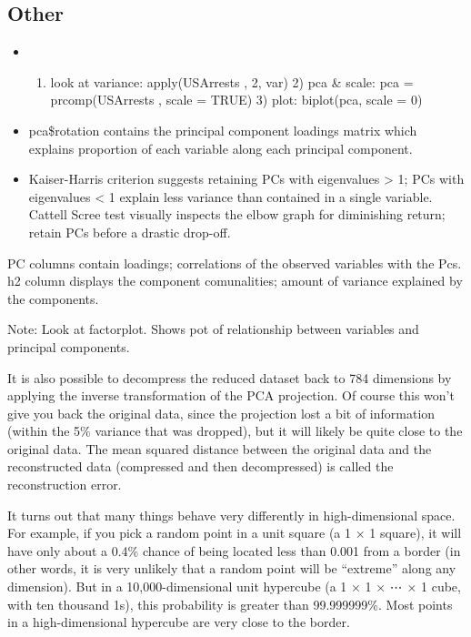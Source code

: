 \documentclass[]{book}
\providecommand{\tightlist}{%
  \setlength{\itemsep}{0pt}\setlength{\parskip}{0pt}}
\theoremstyle{definition}
\theoremstyle{definition}
\theoremstyle{definition}
\theoremstyle{remark}
\begin{document}
\subsection{Other}\label{other-2}

\begin{itemize}
\item
  \begin{enumerate}
  \def\labelenumi{\arabic{enumi})}
  \tightlist
  \item
    look at variance: apply(USArrests , 2, var) \textbar{} 2) pca \&
    scale: pca = prcomp(USArrests , scale = TRUE) \textbar{} 3) plot:
    biplot(pca, scale = 0)
  \end{enumerate}
\item
  pca\$rotation contains the principal component loadings matrix which
  explains proportion of each variable along each principal component.
\item
  Kaiser-Harris criterion suggests retaining PCs with eigenvalues
  \textgreater{} 1; PCs with eigenvalues \textless{} 1 explain less
  variance than contained in a single variable. Cattell Scree test
  visually inspects the elbow graph for diminishing return; retain PCs
  before a drastic drop-off.
\end{itemize}

PC columns contain loadings; correlations of the observed variables with
the Pcs. h2 column displays the component comunalities; amount of
variance explained by the components.

Note: Look at factorplot. Shows pot of relationship between variables
and principal components.

It is also possible to decompress the reduced dataset back to 784
dimensions by applying the inverse transformation of the PCA projection.
Of course this won't give you back the original data, since the
projection lost a bit of information (within the 5\% variance that was
dropped), but it will likely be quite close to the original data. The
mean squared distance between the original data and the reconstructed
data (compressed and then decompressed) is called the reconstruction
error.

It turns out that many things behave very differently in
high-dimensional space. For example, if you pick a random point in a
unit square (a 1 × 1 square), it will have only about a 0.4\% chance of
being located less than 0.001 from a border (in other words, it is very
unlikely that a random point will be ``extreme'' along any dimension).
But in a 10,000-dimensional unit hypercube (a 1 × 1 × ⋯ × 1 cube, with
ten thousand 1s), this probability is greater than 99.999999\%. Most
points in a high-dimensional hypercube are very close to the border.
\end{document}
